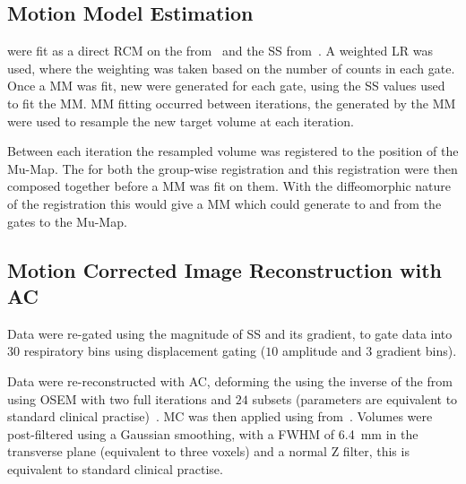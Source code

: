     
    \subsection{Motion Model Estimation} \label{sec:motion_model_estimation}
         were fit as a direct \gls{RCM} on the  from~ and the \gls{SS} from~. A weighted \gls{LR} was used, where the weighting was taken based on the number of counts in each gate. Once a \gls{MM} was fit, new  were generated for each gate, using the \gls{SS} values used to fit the \gls{MM}. \gls{MM} fitting occurred between iterations, the  generated by the \gls{MM} were used to resample the new target volume at each iteration.
        
        Between each iteration the resampled volume was registered to the position of the \gls{Mu-Map}. The  for both the group-wise registration and this registration were then composed together before a \gls{MM} was fit on them. With the diffeomorphic nature of the registration this would give a \gls{MM} which could generate  to and from the gates to the \gls{Mu-Map}.
    
    
    \subsection{Motion Corrected Image Reconstruction with AC} \label{sec:motion_corrected_image_reconstruction_with_ac}
        Data were re-gated using the magnitude of \gls{SS} and its gradient, to gate data into $30$ respiratory bins using displacement gating ($10$ amplitude and $3$ gradient bins).
        
        Data were re-reconstructed with \gls{AC}, deforming the  using the inverse of the  from~ using \gls{OSEM} with two full iterations and $24$ subsets (parameters are equivalent to standard clinical practise)~\cite{Hudson1994}. \gls{MC} was then applied using  from~. Volumes were post-filtered using a Gaussian smoothing, with a \gls{FWHM} of \SI{6.4}{\milli\metre} in the transverse plane (equivalent to three voxels) and a normal Z filter, this is equivalent to standard clinical practise.
    
